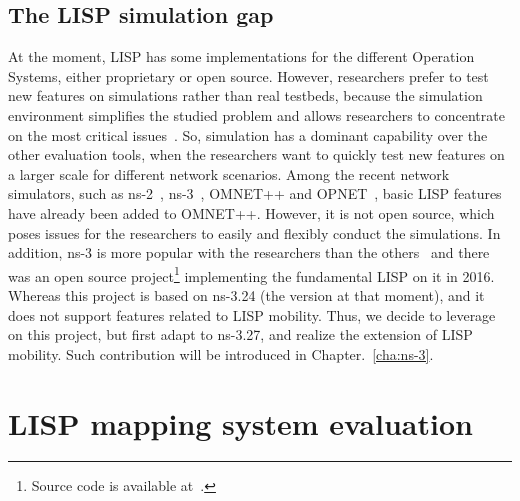\subsection{The LISP simulation gap}
\label{subsec:implementation_missing}
At the moment, LISP has some implementations for the different Operation Systems, either proprietary or open source. However, researchers prefer to test new features on simulations rather than real testbeds, because the simulation environment simplifies the studied problem and allows researchers to concentrate on the most critical issues~\cite{moller2011simulation}. So, simulation has a dominant capability over the other evaluation tools, when the researchers want to quickly test new features on a larger scale for different network scenarios. Among the recent network simulators, such as ns-2~\cite{breslau2000advances}, ns-3~\cite{henderson2008network}, OMNET++ and OPNET~\cite{chang1999network}, basic LISP features have already been added to OMNET++. However, it is not open source, which poses issues for the researchers to easily and flexibly conduct the simulations. In addition, ns-3 is more popular with the researchers than the others~\cite{rana2017implementation} and there was an open source project\footnote{Source code is available at~\cite{lionel2016}.} implementing the fundamental LISP on it in 2016. Whereas this project is based on ns-3.24 (the version at that moment), and it does not support features related to LISP mobility. Thus, we decide to leverage on this project, but first adapt to ns-3.27, and realize the extension of LISP mobility. Such contribution will be introduced in Chapter.~\ref{cha:ns-3}. 

\section{LISP mapping system evaluation}
\label{sec:mds}

